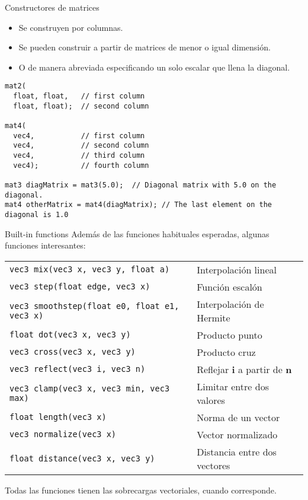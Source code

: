 \begin{frame}[fragile]{Constructores de matrices}
\begin{itemize}
    \item Se construyen por columnas.
    \item Se pueden construir a partir de matrices de menor o igual dimensión.
    \item O de manera abreviada especificando un solo escalar que llena la diagonal.
\end{itemize}
\begin{listing}
\begin{verbatim}
mat2(
  float, float,   // first column
  float, float);  // second column

mat4(
  vec4,           // first column
  vec4,           // second column
  vec4,           // third column
  vec4);          // fourth column

mat3 diagMatrix = mat3(5.0);  // Diagonal matrix with 5.0 on the diagonal.
mat4 otherMatrix = mat4(diagMatrix); // The last element on the diagonal is 1.0
\end{verbatim}
\end{listing}
\end{frame}

\begin{frame}{Built-in functions}
Además de las funciones habituales esperadas, algunas funciones interesantes:
\begin{table}[htb]
  \begin{center}
    \begin{tabular}{l | l }
      \texttt{vec3 mix(vec3 x, vec3 y, float a)} & Interpolación lineal \\
      \texttt{vec3 step(float edge, vec3 x)} & Función escalón \\
      \texttt{vec3 smoothstep(float e0, float e1, vec3 x)} & Interpolación de Hermite \\
      \texttt{float dot(vec3 x, vec3 y)} & Producto punto \\
      \texttt{vec3 cross(vec3 x, vec3 y)} & Producto cruz \\
      \texttt{vec3 reflect(vec3 i, vec3 n)} & Reflejar $\mathbf{i}$ a partir de $\mathbf{n}$ \\
      \texttt{vec3 clamp(vec3 x, vec3 min, vec3 max)} & Limitar entre dos valores \\
      \texttt{float length(vec3 x)} & Norma de un vector \\
      \texttt{vec3 normalize(vec3 x)} & Vector normalizado \\
      \texttt{float distance(vec3 x, vec3 y)} & Distancia entre dos vectores \\
    \end{tabular}
  \end{center}
\end{table}
Todas las funciones tienen las sobrecargas vectoriales, cuando corresponde.
\end{frame}
